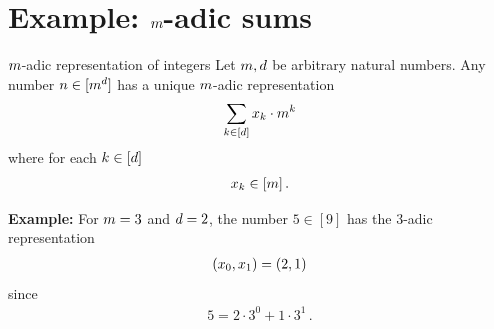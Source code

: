 \documentclass{beamer}
\begin{document}
    \section{Example: $m$-adic sums}


    \begin{frame}{$m$-adic representation of integers}
        Let $m,d$ be arbitrary natural numbers.
        Any number $n\in[m^{d}]$ has a unique $m$-adic representation
        \begin{align*}
            \sum_{k\in[d]} x_{k} \cdot m^{k}
        \end{align*}
        where for each $k\in[d]$
        \begin{align*}
            x_{k} \in [m] \, .
        \end{align*}

            {\bf Example:} For $m=3$ and $d=2$, the number $5\in[9]$ has the $3$-adic representation
        \begin{align*}
            (x_{0},x_{1})
                    = (2,1)
        \end{align*}
        since
        \begin{align*}
            5 = 2\cdot 3^0 + 1\cdot 3^1 \, .
        \end{align*}

    \end{frame}
\end{document}
